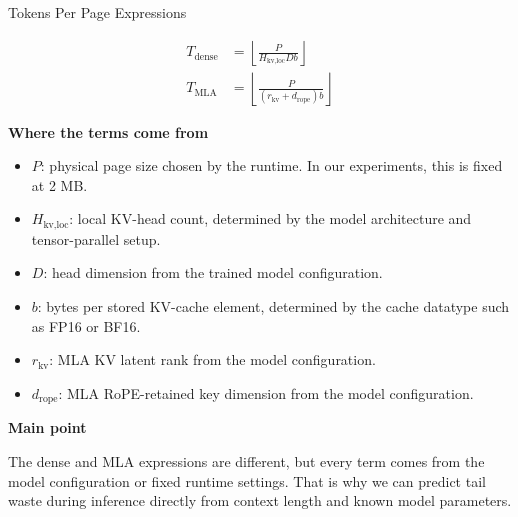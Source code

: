 \documentclass[12pt]{article}
\begin{document}
\begin{center}
{\LARGE Tokens Per Page Expressions}
\end{center}

\vspace{0em}

\begin{align*}
T_{\text{dense}}
&=
\left\lfloor
\frac{P}{H_{\text{kv,loc}} D b}
\right\rfloor
\\[1.2em]
T_{\text{MLA}}
&=
\left\lfloor
\frac{P}{(r_{\text{kv}} + d_{\text{rope}}) b}
\right\rfloor
\end{align*}

\vspace{0.8em}

\noindent\textbf{Where the terms come from}
\begin{itemize}
    \item $P$: physical page size chosen by the runtime. In our experiments, this is fixed at 2 MB.
    \item $H_{\text{kv,loc}}$: local KV-head count, determined by the model architecture and tensor-parallel setup.
    \item $D$: head dimension from the trained model configuration.
    \item $b$: bytes per stored KV-cache element, determined by the cache datatype such as FP16 or BF16.
    \item $r_{\text{kv}}$: MLA KV latent rank from the model configuration.
    \item $d_{\text{rope}}$: MLA RoPE-retained key dimension from the model configuration.
\end{itemize}

\vspace{0.5em}

\noindent\textbf{Main point}

\noindent
The dense and MLA expressions are different, but every term comes from
the model configuration or fixed runtime settings. That is why we can
predict tail waste during inference directly from context length and
known model parameters.
\end{document}
